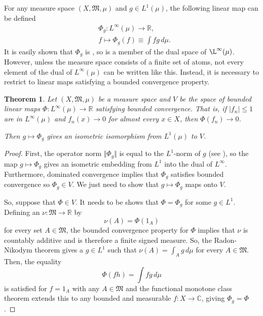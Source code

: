 \documentclass[12pt]{article}
\newtheorem*{theorem*}{Theorem}
\begin{document}
For any measure space $(X,\mathfrak{M},\mu)$ and $g\in L^1(\mu)$, the following linear map can be defined
\begin{align*}
&\Phi_g\colon L^\infty (\mu)\rightarrow\mathbb{R},\\
&f\mapsto\Phi_g(f)\equiv\int fg\,d\mu.
\end{align*}
It is easily shown that $\Phi_g$ is , so is a member of the dual space of $\L^\infty(\mu)$. However, unless the measure space consists of a finite set of atoms, not every element of the dual of $L^\infty(\mu)$ can be written like this. Instead, it is necessary to restrict to linear maps satisfying a bounded convergence property.

\begin{theorem*}
Let $(X,\mathfrak{M},\mu)$ be a  measure space and $V$ be the space of bounded linear maps $\Phi\colon L^\infty(\mu)\rightarrow\mathbb{R}$ satisfying bounded convergence. That is, if $|f_n|\le 1$ are in $L^\infty(\mu)$ and $f_n(x)\rightarrow 0$ for almost every $x\in X$, then $\Phi(f_n)\rightarrow 0$.

Then $g\mapsto\Phi_g$ gives an isometric isomorphism from $L^1(\mu)$ to $V$.
\end{theorem*}
\begin{proof}
First, the operator norm $\Vert\Phi_g\Vert$ is equal to the $L^1$-norm of $g$ (see ), so the map $g\mapsto\Phi_g$ gives an isometric embedding from $L^1$ into the dual of $L^\infty$. Furthermore, dominated convergence implies that $\Phi_g$ satisfies bounded convergence so $\Phi_g\in V$. We just need to show that $g\mapsto\Phi_g$ maps onto $V$.

So, suppose that $\Phi\in V$. It needs to be shows that $\Phi=\Phi_g$ for some $g\in L^1$.
Defining an  $\nu\colon\mathfrak{M}\rightarrow\mathbb{R}$ by
\begin{equation*}
\nu(A)=\Phi(1_A)
\end{equation*}
for every set $A\in\mathfrak{M}$, the bounded convergence property for $\Phi$ implies that $\nu$ is countably additive and is therefore a finite signed measure. So, the Radon-Nikodym theorem gives a $g\in L^1$ such that $\nu(A)=\int_A g\,d\mu$ for every $A\in\mathfrak{M}$.
Then, the equality
\begin{equation*}
\Phi(fh)= \int fg\,d\mu
\end{equation*}
is satisfied for $f=1_A$ with any $A\in\mathfrak{M}$ and the functional monotone class theorem extends this to any bounded and measurable $f\colon X\rightarrow\mathbb{C}$, giving $\Phi_g=\Phi$.
\end{proof}

\end{document}
